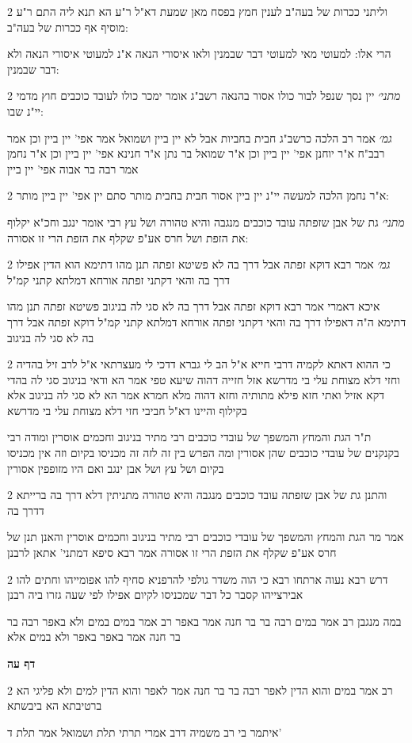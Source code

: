\documentclass[12pt, openany]{book}
\newcommand{\sethebfont}{
\fontsize{10.5pt}{21.0pt} \selectfont
}
\newcommand{\twocol}[1]{
	{\sethebfont \begin{multicols}{2}
			#1
	\end{multicols}}	
}
\newcommand{\sectname}{}
\newcommand{\newsection}[1]{
	\addcontentsline{toc}{section}{#1}
	\renewcommand{\sectname}{#1}	
	\vspace{-\baselineskip}
	\begin{center}
		\textbf{%
\fontsize{16pt}{16pt}\selectfont
			#1}
	\end{center}
	\vspace{-\baselineskip}
	\nopagebreak
}
\begin{document}
\twocol{וליתני ככרות של בעה"ב לענין חמץ בפסח מאן שמעת דא"ל ר"ע הא תנא ליה התם ר"ע מוסיף אף ככרות של בעה"ב:
\par הרי אלו: למעוטי מאי למעוטי דבר שבמנין ולאו איסורי הנאה א"נ למעוטי איסורי הנאה ולא דבר שבמנין:}
\twocol{{\large\emph{מתני׳}} יין נסך שנפל לבור כולו אסור בהנאה רשב"ג אומר ימכר כולו לעובד כוכבים חוץ מדמי יי"נ שבו:
\par {\large\emph{גמ׳}} אמר רב הלכה כרשב"ג חבית בחביות אבל לא יין ביין ושמואל אמר אפי' יין ביין וכן אמר רבב"ח א"ר יוחנן אפי' יין ביין וכן א"ר שמואל בר נתן א"ר חנינא אפי' יין ביין וכן א"ר נחמן אמר רבה בר אבוה אפי' יין ביין}
\twocol{א"ר נחמן הלכה למעשה יי"נ יין ביין אסור חבית בחבית מותר סתם יין אפי' יין ביין מותר:
\par {\large\emph{מתני׳}} גת של אבן שזפתה עובד כוכבים מנגבה והיא טהורה ושל עץ רבי אומר ינגב וחכ"א יקלוף את הזפת ושל חרס אע"פ שקלף את הזפת הרי זו אסורה:}
\twocol{{\large\emph{גמ׳}} אמר רבא דוקא זפתה אבל דרך בה לא פשיטא זפתה תנן מהו דתימא הוא הדין אפילו דרך בה והאי דקתני זפתה אורחא דמלתא קתני קמ"ל
\par איכא דאמרי אמר רבא דוקא זפתה אבל דרך בה לא סגי לה בניגוב פשיטא זפתה תנן מהו דתימא ה"ה דאפילו דרך בה והאי דקתני זפתה אורחא דמלתא קתני קמ"ל דוקא זפתה אבל דרך בה לא סגי לה בניגוב}
\twocol{כי ההוא דאתא לקמיה דרבי חייא א"ל הב לי גברא דדכי לי מעצרתאי א"ל לרב זיל בהדיה וחזי דלא מצוחת עלי בי מדרשא אזל חזייה דהוה שיעא טפי אמר הא ודאי בניגוב סגי לה בהדי דקא אזיל ואתי חזא פילא מתותיה וחזא דהוה מלא חמרא אמר הא לא סגי לה בניגוב אלא בקילוף והיינו דא"ל חביבי חזי דלא מצוחת עלי בי מדרשא
\par ת"ר הגת והמחץ והמשפך של עובדי כוכבים רבי מתיר בניגוב וחכמים אוסרין ומודה רבי בקנקנים של עובדי כוכבים שהן אסורין ומה הפרש בין זה לזה זה מכניסו בקיום וזה אין מכניסו בקיום ושל עץ ושל אבן ינגב ואם היו מזופפין אסורין}
\twocol{והתנן גת של אבן שזפתה עובד כוכבים מנגבה והיא טהורה מתניתין דלא דרך בה ברייתא דדרך בה
\par אמר מר הגת והמחץ והמשפך של עובדי כוכבים רבי מתיר בניגוב וחכמים אוסרין והאנן תנן של חרס אע"פ שקלף את הזפת הרי זו אסורה אמר רבא סיפא דמתני' אתאן לרבנן}
\twocol{דרש רבא נעוה ארתחו רבא כי הוה משדר גולפי להרפניא סחיף להו אפומייהו וחתים להו אבירצייהו קסבר כל דבר שמכניסו לקיום אפילו לפי שעה גזרו ביה רבנן
\par במה מנגבן רב אמר במים רבה בר בר חנה אמר באפר רב אמר במים במים ולא באפר רבה בר בר חנה אמר באפר באפר ולא במים אלא}
\newsection{דף עה}
\twocol{רב אמר במים והוא הדין לאפר רבה בר בר חנה אמר לאפר והוא הדין למים ולא פליגי הא ברטיבתא הא ביבשתא
\par איתמר בי רב משמיה דרב אמרי תרתי תלת ושמואל אמר תלת ד'}
\end{document}

